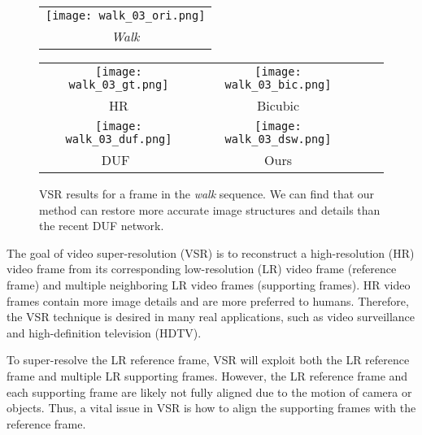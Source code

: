 \documentclass[10pt,twocolumn,letterpaper]{article}
\begin{document}
\begin{figure}
	\scriptsize
	\centering


    \begin{adjustbox}{valign=t}
\begin{tabular}{c}
				\texttt{[image: walk\_03\_ori.png]}
				\\
				\textit{Walk}
			\end{tabular}
	\end{adjustbox}
	\hspace{-2.3mm}
		\begin{adjustbox}{valign=t}
\begin{tabular}{cccc}
				\texttt{[image: walk\_03\_gt.png]} \hspace{-1.5mm} &
				\texttt{[image: walk\_03\_bic.png]}
				\\
				HR \hspace{-1.5mm} &
				Bicubic
				\\
		
				\texttt{[image: walk\_03\_duf.png]} \hspace{-1.5mm} &
				\texttt{[image: walk\_03\_dsw.png]}
				\\
				DUF~\cite{jo2018deep} \hspace{-1.5mm} &
				Ours
				\\
			\end{tabular}
			\end{adjustbox}

\caption{VSR results for a frame in the \textit{walk} sequence. We can find that our method can restore more accurate image structures and details than the recent DUF network.}
	\label{fig:democase}
\end{figure}


The goal of video super-resolution (VSR) is to reconstruct a high-resolution (HR) video frame from its corresponding low-resolution (LR) video frame (reference frame) and multiple neighboring LR video frames (supporting frames). HR video frames contain more image details and are more preferred to humans. Therefore, the VSR technique is desired in many real applications, such as video surveillance and high-definition television (HDTV).

To super-resolve the LR reference frame, VSR will exploit both the LR reference frame and multiple LR supporting frames. However, the LR reference frame and each supporting frame are likely not fully aligned due to the motion of camera or objects. Thus, a vital issue in VSR is how to align the supporting frames with the reference frame.
\end{document}
